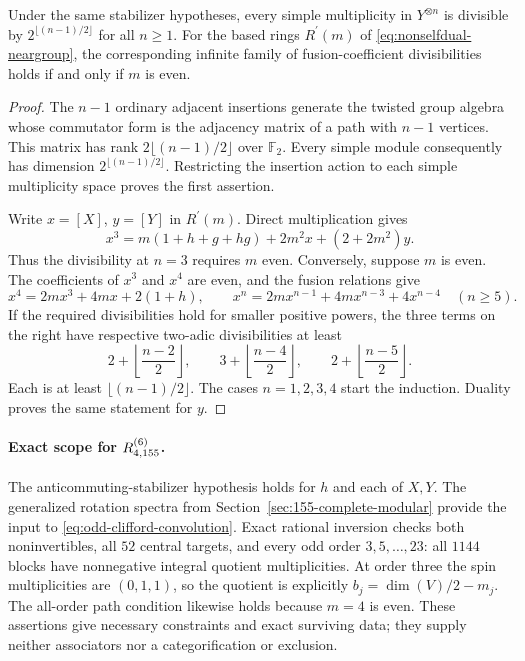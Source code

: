\begin{proposition}
\label{prop:rprime-path-divisibility}
Under the same stabilizer hypotheses, every simple multiplicity in
$Y^{\otimes n}$ is divisible by $2^{\lfloor(n-1)/2\rfloor}$ for all
$n\ge1$. For the based rings $R^\prime(m)$ of
\eqref{eq:nonselfdual-neargroup}, the corresponding infinite family of
fusion-coefficient divisibilities holds if and only if $m$ is even.
\end{proposition}
\begin{proof}
The $n-1$ ordinary adjacent insertions generate the twisted group algebra
whose commutator form is the adjacency matrix of a path with $n-1$
vertices. This matrix has rank $2\lfloor(n-1)/2\rfloor$ over
$\mathbb F_2$. Every simple module consequently has dimension
$2^{\lfloor(n-1)/2\rfloor}$. Restricting the insertion action to each
simple multiplicity space proves the first assertion.

Write $x=[X]$, $y=[Y]$ in $R^\prime(m)$. Direct multiplication gives
\[
 x^3=m(1+h+g+hg)+2m^2x+(2+2m^2)y.
\]
Thus the divisibility at $n=3$ requires $m$ even. Conversely, suppose
$m$ is even. The coefficients of $x^3$ and $x^4$ are even, and the
fusion relations give
\[
 x^4=2mx^3+4mx+2(1+h),\qquad
 x^n=2mx^{n-1}+4mx^{n-3}+4x^{n-4}\quad(n\ge5).
\]
If the required divisibilities hold for smaller positive powers, the
three terms on the right have respective two-adic divisibilities at least
\[
 2+\left\lfloor\frac{n-2}{2}\right\rfloor,\qquad
 3+\left\lfloor\frac{n-4}{2}\right\rfloor,\qquad
 2+\left\lfloor\frac{n-5}{2}\right\rfloor.
\]
Each is at least $\lfloor(n-1)/2\rfloor$. The cases $n=1,2,3,4$
start the induction. Duality proves the same statement for $y$.
\end{proof}

\paragraph{Exact scope for $R^{(6)}_{4,155}$.}
The anticommuting-stabilizer hypothesis holds for $h$ and each of
$X,Y$. The generalized rotation spectra from
Section~\ref{sec:155-complete-modular} provide the input to
\eqref{eq:odd-clifford-convolution}. Exact rational inversion checks
both noninvertibles, all $52$ central targets, and every odd order
$3,5,\ldots,23$: all $1144$ blocks have nonnegative integral quotient
multiplicities. At order three the spin multiplicities are $(0,1,1)$,
so the quotient is explicitly $b_j=\dim(V)/2-m_j$.
The all-order path condition likewise holds because $m=4$ is even.
These assertions give necessary constraints and exact surviving data;
they supply neither associators nor a categorification or exclusion.


